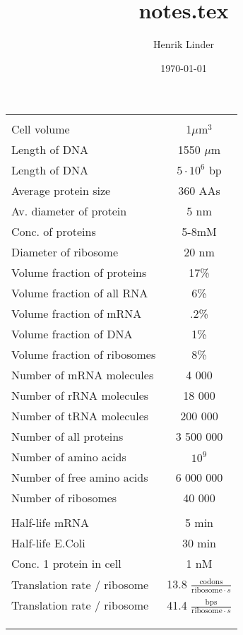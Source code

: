 \documentclass{article}
\title{notes.tex }
\author{Henrik Linder}
\date{\today}
\begin{document}
\maketitle

\begin{center}
\begin{tabular}{ |l|c| } 
 \hline
 &\\
 Cell volume &1$\mu $m$^3$ \\ 
  Length of DNA&1550 $\mu $m \\ 
  Length of DNA &$5\cdot 10^{6}$ bp \\ 
  Average protein size&360 AAs \\ 
					  Av. diameter of protein&5 nm\\
					  Conc. of proteins&5-8mM\\
					  Diameter of ribosome&20 nm\\
					  Volume fraction of proteins&17\%\\
					  Volume fraction of all RNA&6\%\\
					  Volume fraction of mRNA&.2\%\\
					  Volume fraction of DNA&1\%\\
					  Volume fraction of ribosomes&8\%\\
					  Number of mRNA molecules&4 000\\
					  Number of rRNA molecules&18 000\\
					  Number of tRNA molecules&200 000\\
					  Number of all proteins&3 500 000\\
					  Number of amino acids&$10^9$\\
					  Number of free amino acids&6 000 000\\
					  Number of ribosomes&40 000\\
					  &\\
					  Half-life mRNA& 5 min\\
					  Half-life E.Coli& 30 min\\
					  Conc. 1 protein in cell&1 nM\\
					  Translation rate / ribosome&13.8 $\frac{\text{codons}}{\text{ribosome}\cdot s}$\\
					  Translation rate / ribosome&41.4 $\frac{\text{bps}}{\text{ribosome}\cdot s}$\\
					  &\\
					  &\\
					  &\\
 \hline
\end{tabular}
\end{center}
\end{document}

